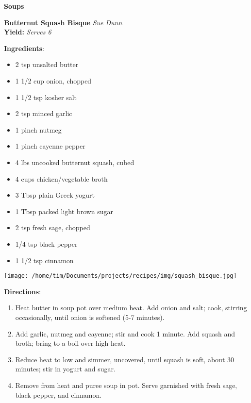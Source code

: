 \documentclass[11pt, twoside, openany]{book}
\begin{document}
{\newpage \LARGE \textbf{Soups}} \label{soups}\vspace{4mm}\\
\noindent\begin{minipage}[t]{\linewidth}%
{\Large\textbf{Butternut Squash Bisque}} \label{butternut-squash-bisque}\hfill\textit{Sue Dunn}\\
\textbf{Yield:} \textit{Serves 6}\\
\noindent\begin{minipage}[t]{0.78\linewidth}%
\textbf{Ingredients}:\vspace{-3mm}
\begin{multicols}{2}
\begin{itemize}\setlength\itemsep{-1mm}
\item 2 tsp unsalted butter
\item 1 1/2 cup onion, chopped
\item 1 1/2 tsp kosher salt
\item 2 tsp minced garlic
\item 1 pinch nutmeg
\item 1 pinch cayenne pepper
\item 4 lbs uncooked butternut squash, cubed
\item 4 cups chicken/vegetable broth
\item 3 Tbsp plain Greek yogurt
\item 1 Tbsp packed light brown sugar
\item 2 tsp fresh sage, chopped
\item 1/4 tsp black pepper
\item 1 1/2 tsp cinnamon
\end{itemize}
\end{multicols}
\end{minipage}
\noindent\begin{minipage}[t]{0.18\linewidth}
\centering \strut\vspace*{-\baselineskip}\newline
\texttt{[image: /home/tim/Documents/projects/recipes/img/squash\_bisque.jpg]}\\
\end{minipage}\vspace{3mm}
\textbf{Directions}:
\vspace{-3mm}\begin{enumerate}\setlength\itemsep{-1mm}
\item Heat butter in soup pot over medium heat. Add onion and salt; cook, stirring occasionally, until onion is softened (5-7 minutes).
\item Add garlic, nutmeg and cayenne; stir and cook 1 minute. Add squash and broth; bring to a boil over high heat.
\item Reduce heat to low and simmer, uncovered, until squash is soft, about 30 minutes; stir in yogurt and sugar.
\item Remove from heat and puree soup in pot. Serve garnished with fresh sage, black pepper, and cinnamon.
\end{enumerate}
\end{minipage}\vspace{8mm}
\end{document}
